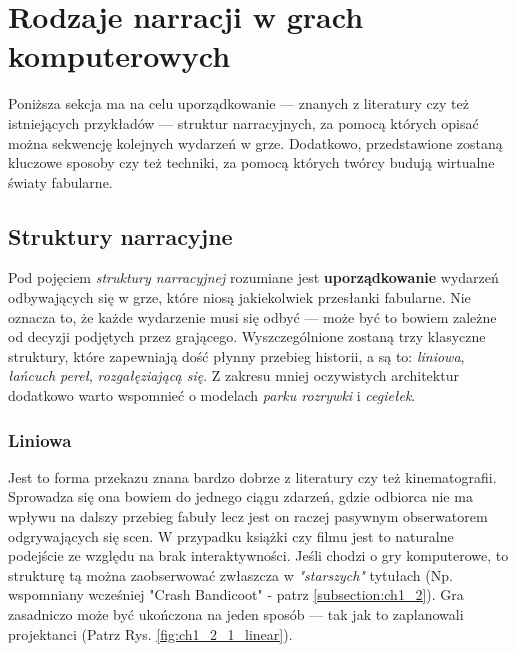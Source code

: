 \graphicspath{{chapters/chapter2/imgs/}}

\chapter{Rodzaje narracji w grach komputerowych}\label{chapter:ch2}

Poniższa sekcja ma na celu uporządkowanie --- znanych z literatury czy też istniejących
przykładów --- struktur narracyjnych, za pomocą których opisać można sekwencję kolejnych
wydarzeń w grze. Dodatkowo, przedstawione zostaną kluczowe sposoby czy też techniki, za
pomocą których twórcy budują wirtualne światy fabularne.

\section{Struktury narracyjne}\label{subsection:ch1_2_1}

Pod pojęciem \textit{struktury narracyjnej} rozumiane jest \textbf{uporządkowanie}
wydarzeń odbywających się w grze, które niosą jakiekolwiek przesłanki fabularne.
Nie oznacza to, że każde wydarzenie musi się odbyć --- może być to bowiem zależne od
decyzji podjętych przez grającego. Wyszczególnione zostaną trzy klasyczne struktury,
które zapewniają dość płynny przebieg historii, a są to: \textit{liniowa}, \textit{łańcuch pereł},
\textit{rozgałęziającą się}\cite{the_evolution_of_video_games}\cite{theorising_narrative}\cite{narrative_structures}.
Z zakresu mniej oczywistych architektur dodatkowo warto wspomnieć o modelach
\textit{parku rozrywki} i \textit{cegiełek}\cite{theorising_narrative}.

\subsection{Liniowa}

Jest to forma przekazu znana bardzo dobrze z literatury czy też kinematografii. Sprowadza się ona
bowiem do jednego ciągu zdarzeń, gdzie odbiorca nie ma wpływu na dalszy przebieg fabuły lecz jest
on raczej pasywnym obserwatorem odgrywających się scen. W przypadku książki czy filmu jest to
naturalne podejście ze względu na brak interaktywności. Jeśli chodzi o gry komputerowe, to
strukturę tą można zaobserwować zwłaszcza w \textit{"starszych"} tytułach (Np. wspomniany wcześniej
"Crash Bandicoot" - patrz \ref{subsection:ch1_2}). Gra zasadniczo może być ukończona na jeden
sposób --- tak jak to zaplanowali projektanci\cite{the_evolution_of_video_games} (Patrz Rys. \ref{fig:ch1_2_1_linear}).

